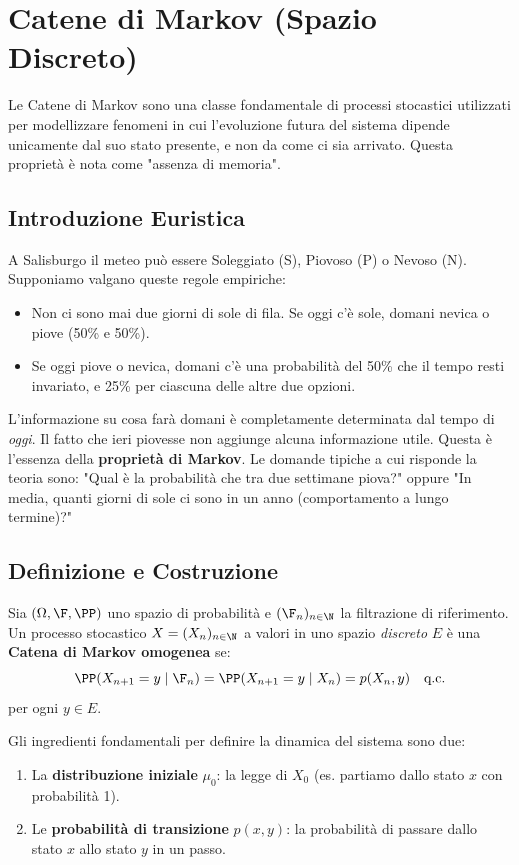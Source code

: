 
\chapter{Catene di Markov (Spazio Discreto)}

Le Catene di Markov sono una classe fondamentale di processi stocastici utilizzati per modellizzare fenomeni in cui l'evoluzione futura del sistema dipende unicamente dal suo stato presente, e non da come ci sia arrivato. Questa proprietà è nota come "assenza di memoria".

\section{Introduzione Euristica}

\begin{esempio}
A Salisburgo il meteo può essere Soleggiato (S), Piovoso (P) o Nevoso (N). Supponiamo valgano queste regole empiriche:
\begin{itemize}
    \item Non ci sono mai due giorni di sole di fila. Se oggi c'è sole, domani nevica o piove (50\% e 50\%).
    \item Se oggi piove o nevica, domani c'è una probabilità del 50\% che il tempo resti invariato, e 25\% per ciascuna delle altre due opzioni.
\end{itemize}
L'informazione su cosa farà domani è completamente determinata dal tempo di \emph{oggi}. Il fatto che ieri piovesse non aggiunge alcuna informazione utile. Questa è l'essenza della \textbf{proprietà di Markov}.
Le domande tipiche a cui risponde la teoria sono: "Qual è la probabilità che tra due settimane piova?" oppure "In media, quanti giorni di sole ci sono in un anno (comportamento a lungo termine)?"
\end{esempio}

\section{Definizione e Costruzione}

Sia $(\Omega, \F, \PP)$ uno spazio di probabilità e $(\F_n)_{n \in \N}$ la filtrazione di riferimento. Un processo stocastico $X = (X_n)_{n \in \N}$ a valori in uno spazio \emph{discreto} $E$ è una \textbf{Catena di Markov omogenea} se:
\[ \PP(X_{n+1} = y \mid \F_n) = \PP(X_{n+1} = y \mid X_n) = p(X_n, y) \quad \text{q.c.} \]
per ogni $y \in E$.

Gli ingredienti fondamentali per definire la dinamica del sistema sono due:
\begin{enumerate}
    \item La \textbf{distribuzione iniziale} $\mu_0$: la legge di $X_0$ (es. partiamo dallo stato $x$ con probabilità 1).
    \item Le \textbf{probabilità di transizione} $p(x, y)$: la probabilità di passare dallo stato $x$ allo stato $y$ in un passo. 
\end{enumerate}


